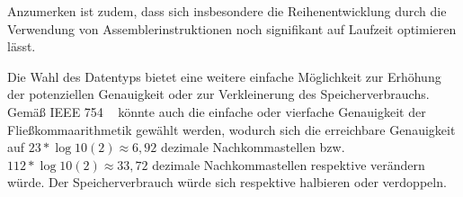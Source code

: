 \documentclass[course=erap] {aspdoc}
\begin{document}
    Anzumerken ist zudem, dass sich insbesondere die Reihenentwicklung durch die Verwendung von Assemblerinstruktionen noch signifikant auf Laufzeit optimieren lässt.

    Die Wahl des Datentyps bietet eine weitere einfache Möglichkeit zur Erhöhung der potenziellen Genauigkeit oder zur Verkleinerung des Speicherverbrauchs.
    Gemäß IEEE 754 ~\cite{StandardforBinaryFloating} könnte auch die einfache oder vierfache Genauigkeit der Fließkommaarithmetik gewählt werden, wodurch sich die erreichbare Genauigkeit auf $23*\log10(2) \approx 6,92$ dezimale Nachkommastellen bzw. $112*\log10(2) \approx 33,72$ dezimale Nachkommastellen respektive verändern würde.
    Der Speicherverbrauch würde sich respektive halbieren oder verdoppeln.

    
    
\end{document}
